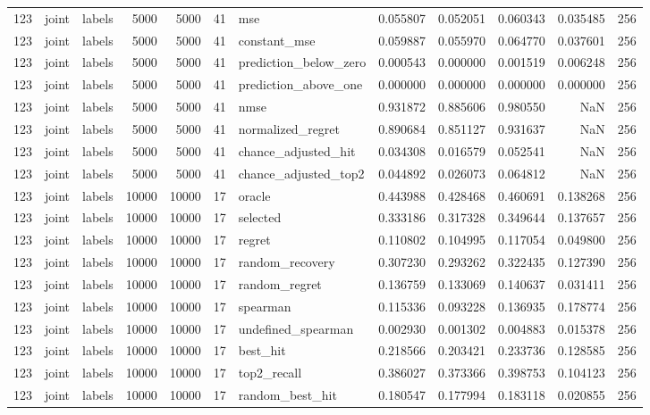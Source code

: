 \begin{tabular}{rllrrrlrrrrr}
123 & joint & labels & 5000 & 5000 & 41 & mse & 0.055807 & 0.052051 & 0.060343 & 0.035485 & 256 \\
123 & joint & labels & 5000 & 5000 & 41 & constant_mse & 0.059887 & 0.055970 & 0.064770 & 0.037601 & 256 \\
123 & joint & labels & 5000 & 5000 & 41 & prediction_below_zero & 0.000543 & 0.000000 & 0.001519 & 0.006248 & 256 \\
123 & joint & labels & 5000 & 5000 & 41 & prediction_above_one & 0.000000 & 0.000000 & 0.000000 & 0.000000 & 256 \\
123 & joint & labels & 5000 & 5000 & 41 & nmse & 0.931872 & 0.885606 & 0.980550 & NaN & 256 \\
123 & joint & labels & 5000 & 5000 & 41 & normalized_regret & 0.890684 & 0.851127 & 0.931637 & NaN & 256 \\
123 & joint & labels & 5000 & 5000 & 41 & chance_adjusted_hit & 0.034308 & 0.016579 & 0.052541 & NaN & 256 \\
123 & joint & labels & 5000 & 5000 & 41 & chance_adjusted_top2 & 0.044892 & 0.026073 & 0.064812 & NaN & 256 \\
123 & joint & labels & 10000 & 10000 & 17 & oracle & 0.443988 & 0.428468 & 0.460691 & 0.138268 & 256 \\
123 & joint & labels & 10000 & 10000 & 17 & selected & 0.333186 & 0.317328 & 0.349644 & 0.137657 & 256 \\
123 & joint & labels & 10000 & 10000 & 17 & regret & 0.110802 & 0.104995 & 0.117054 & 0.049800 & 256 \\
123 & joint & labels & 10000 & 10000 & 17 & random_recovery & 0.307230 & 0.293262 & 0.322435 & 0.127390 & 256 \\
123 & joint & labels & 10000 & 10000 & 17 & random_regret & 0.136759 & 0.133069 & 0.140637 & 0.031411 & 256 \\
123 & joint & labels & 10000 & 10000 & 17 & spearman & 0.115336 & 0.093228 & 0.136935 & 0.178774 & 256 \\
123 & joint & labels & 10000 & 10000 & 17 & undefined_spearman & 0.002930 & 0.001302 & 0.004883 & 0.015378 & 256 \\
123 & joint & labels & 10000 & 10000 & 17 & best_hit & 0.218566 & 0.203421 & 0.233736 & 0.128585 & 256 \\
123 & joint & labels & 10000 & 10000 & 17 & top2_recall & 0.386027 & 0.373366 & 0.398753 & 0.104123 & 256 \\
123 & joint & labels & 10000 & 10000 & 17 & random_best_hit & 0.180547 & 0.177994 & 0.183118 & 0.020855 & 256 \\

\end{tabular}
